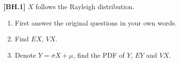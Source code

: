 \begin{exercise}
	\textbf{[BH.1]}
$X$ follows the Rayleigh distribution.
	\begin{enumerate}
		\item First answer the original questions in your own words.
		\item Find $EX$, $VX$.
		\item Denote $Y=\sigma X+\mu$, find the PDF of $Y$, $EY$ and $VX$.
	\end{enumerate}   
\end{exercise}
